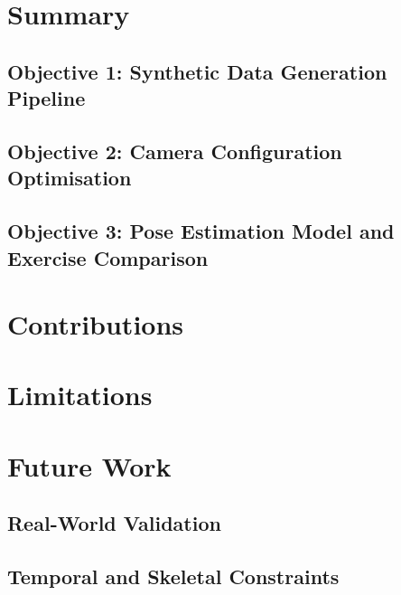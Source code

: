 \label{chap:conclusion}

\section{Summary}
\label{sec:summary}

\subsection{Objective 1: Synthetic Data Generation Pipeline}

\subsection{Objective 2: Camera Configuration Optimisation}

\subsection{Objective 3: Pose Estimation Model and Exercise Comparison}

\section{Contributions}
\label{sec:contributions}

\section{Limitations}
\label{sec:limitations}

\section{Future Work}
\label{sec:futurework}

\subsection{Real-World Validation}

\subsection{Temporal and Skeletal Constraints}


